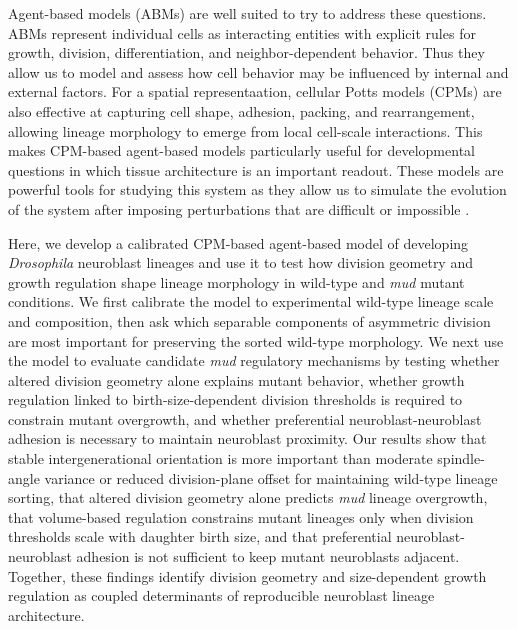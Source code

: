 Agent-based models (ABMs) are well suited to try to address these questions.
ABMs represent individual cells as interacting entities with explicit rules for growth, division, differentiation, and neighbor-dependent behavior.
Thus they allow us to model and assess how cell behavior may be influenced by internal and external factors.
For a spatial representaation, cellular Potts models (CPMs) are also effective at capturing cell shape, adhesion, packing, and rearrangement, allowing lineage morphology to emerge from local cell-scale interactions\cite{graner_1992_simulationbiologicalcell, glazier_1993_simulationdifferentialadhesion, merks_2005_cellcenteredapproachdevelopmental, hirashima_2017_cellularpottsmodeling}.
This makes CPM-based agent-based models particularly useful for developmental questions in which tissue architecture is an important readout.
These models are powerful tools for studying this system as they allow us to simulate the evolution of the system after imposing perturbations that are difficult or impossible \invivo.

Here, we develop a calibrated CPM-based agent-based model of developing \textit{Drosophila} neuroblast lineages and use it to test how division geometry and growth regulation shape lineage morphology in wild-type and \textit{mud} mutant conditions.
We first calibrate the model to experimental wild-type lineage scale and composition, then ask which separable components of asymmetric division are most important for preserving the sorted wild-type morphology.
We next use the model to evaluate candidate \textit{mud} regulatory mechanisms by testing whether altered division geometry alone explains mutant behavior, whether growth regulation linked to birth-size-dependent division thresholds is required to constrain mutant overgrowth, and whether preferential neuroblast-neuroblast adhesion is necessary to maintain neuroblast proximity.
Our results show that stable intergenerational orientation is more important than moderate spindle-angle variance or reduced division-plane offset for maintaining wild-type lineage sorting, that altered division geometry alone predicts \textit{mud} lineage overgrowth, that volume-based regulation constrains mutant lineages only when division thresholds scale with daughter birth size, and that preferential neuroblast-neuroblast adhesion is not sufficient to keep mutant neuroblasts adjacent.
Together, these findings identify division geometry and size-dependent growth regulation as coupled determinants of reproducible neuroblast lineage architecture.
